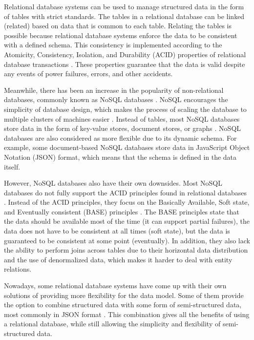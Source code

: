 Relational database systems can be used to manage structured data in the form
of tables with strict standards. The tables in a relational database can be
linked (related) based on data that is common to each table. Relating the
tables is possible because relational database systems enforce the data to be
consistent with a defined schema. This consistency is implemented according to
the Atomicity, Consistency, Isolation, and Durability (ACID) properties of
relational database transactions \cite{abramova_nosql}. These properties
guarantee that the data is valid despite any events of power failures, errors,
and other accidents.

Meanwhile, there has been an increase in the popularity of non-relational
databases, commonly known as NoSQL databases \cite{paul_nosql}. NoSQL
encourages the simplicity of database design, which makes the process of
scaling the database to multiple clusters of machines easier
\cite{leavitt_nosql}. Instead of tables, most NoSQL databases store data in the
form of key-value stores, document stores, or graphs \cite{strauch_nosql}.
NoSQL databases are also considered as more flexible due to its dynamic schema.
For example, some document-based NoSQL databases store data in JavaScript
Object Notation (JSON) format, which means that the schema is defined in the
data itself.

However, NoSQL databases also have their own downsides. Most NoSQL databases do
not fully support the ACID principles found in relational databases
\cite{cattell_nosql}. Instead of the ACID principles, they focus on the
Basically Available, Soft state, and Eventually consistent (BASE) principles
\cite{abramova_nosql}. The BASE principles state that the data should be
available most of the time (it can support partial failures), the data does not
have to be consistent at all times (soft state), but the data is guaranteed to
be consistent at some point (eventually). In addition, they also lack the
ability to perform joins across tables due to their horizontal data
distribution \cite{pokorny_nosql} and the use of denormalized data, which makes
it harder to deal with entity relations.

Nowadays, some relational database systems have come up with their own
solutions of providing more flexibility for the data model. Some of them
provide the option to combine structured data with some form of semi-structured
data, most commonly in JSON format \cite{mariadb_json}. This combination gives
all the benefits of using a relational database, while still allowing the
simplicity and flexibility of semi-structured data.

